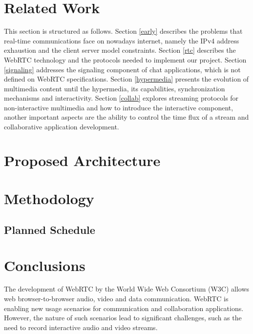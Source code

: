 \documentclass{llncs}
\begin{document}
\section{Related Work}\label{related}
 This section is structured as follows.
 Section \ref{early} describes the problems that real-time communications face on nowadays internet, namely the \ac{IPv4} address exhaustion and the client server model constraints. 
 Section \ref{rtc} describes the \ac{WebRTC} technology and the protocols needed to implement our project. 
 Section \ref{signaling} addresses the signaling component of chat applications, which is not defined on \ac{WebRTC} specifications. 
 Section \ref{hypermedia} presents the evolution of multimedia content until the hypermedia, its capabilities, synchronization mechanisms and interactivity. 
 Section \ref{collab} explores streaming protocols for non-interactive multimedia and how to introduce the interactive component, another important aspects are the ability to control the time flux of a stream and collaborative application development.
        
  
  
  
  

\section{Proposed Architecture}\label{arch} %
  

\section{Methodology}\label{meth} %



		



	\subsection{Planned Schedule} %
		

\section{Conclusions}\label{concl} %
  The development of WebRTC by the World Wide Web Consortium (W3C) allows web browser-to-browser audio, video and data communication. WebRTC is enabling new usage scenarios for communication and collaboration applications. However, the nature of such scenarios lead to significant challenges, such as the need to record interactive audio and video streams.
\end{document}
